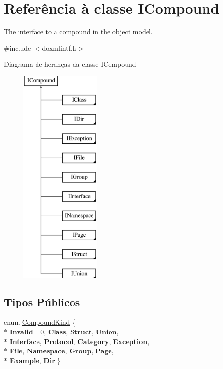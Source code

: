 \hypertarget{class_i_compound}{\section{Referência à classe I\-Compound}
\label{class_i_compound}
}


The interface to a compound in the object model.  




{\ttfamily \#include $<$doxmlintf.\-h$>$}

Diagrama de heranças da classe I\-Compound\begin{figure}[H]
\begin{center}
\leavevmode
\includegraphics[height=11.000000cm]{class_i_compound}
\end{center}
\end{figure}
\subsection*{Tipos Públicos}
\begin{DoxyCompactItemize}
\item 
enum \hyperlink{class_i_compound_a7063885b1cabbff5f94849960f08ecb2}{Compound\-Kind} \{ \\*
{\bfseries Invalid} =0, 
{\bfseries Class}, 
{\bfseries Struct}, 
{\bfseries Union}, 
\\*
{\bfseries Interface}, 
{\bfseries Protocol}, 
{\bfseries Category}, 
{\bfseries Exception}, 
\\*
{\bfseries File}, 
{\bfseries Namespace}, 
{\bfseries Group}, 
{\bfseries Page}, 
\\*
{\bfseries Example}, 
{\bfseries Dir}
 \}
\end{DoxyCompactItemize}
